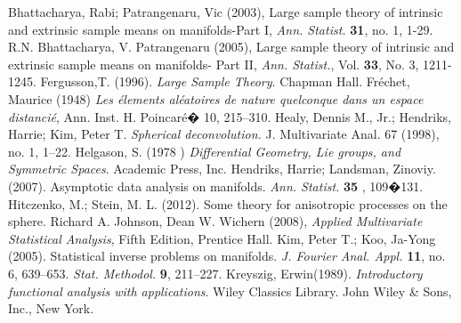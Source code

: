 \documentclass[a0,landscape]{a0poster}
\begin{document}
\begin{multicols}{4}

{\small
\begin{thebibliography}{1}
 Bhattacharya, Rabi; Patrangenaru, Vic (2003), Large sample theory
of intrinsic and extrinsic sample means on manifolds-Part I,  {\it
Ann. Statist.} {\bf 31}, no. 1, 1-29.
%
 R.N. Bhattacharya, V. Patrangenaru (2005), Large sample theory  of
    intrinsic and extrinsic sample means  on manifolds- Part II,
    {\em Ann. Statist.}, Vol. {\bf 33}, No. 3, 1211- 1245.
Fergusson,T. (1996).  {\it Large Sample Theory}.  Chapman Hall.
   Fr\'echet, Maurice (1948) {\it Les \'elements
 al\'eatoires de nature
quelconque dans un espace distanci\'e}, Ann. Inst. H. Poincar\'e�
10, 215--310.
%
 Healy, Dennis M., Jr.; Hendriks, Harrie; Kim, Peter
T. {\it Spherical deconvolution.}  J. Multivariate Anal. 67 (1998),
no. 1, 1--22.
%
 Helgason, S. (1978 ) { \it Differential Geometry, Lie groups,
and Symmetric Spaces}. Academic Press, Inc.
%
Hendriks, Harrie; Landsman, Zinoviy. (2007). Asymptotic data
analysis on manifolds. {\em Ann. Statist.} {\bf 35} , 109�131.
%
  Hitczenko, M.; Stein, M. L. (2012). Some theory for anisotropic processes on the sphere.
 Richard A. Johnson, Dean W. Wichern (2008), {\em Applied Multivariate Statistical Analysis}, Fifth Edition, Prentice Hall.
%
     Kim, Peter T.; Koo, Ja-Yong (2005). Statistical inverse problems on manifolds. {\em J. Fourier Anal. Appl.} {\bf  11}, no. 6, 639--653.
{\em Stat. Methodol.} {\bf 9}, 211--227.
  Kreyszig, Erwin(1989). {\em Introductory functional analysis with applications}. Wiley Classics Library. John Wiley \& Sons, Inc., New York.

\end{thebibliography}}
\end{multicols}
\end{document}
